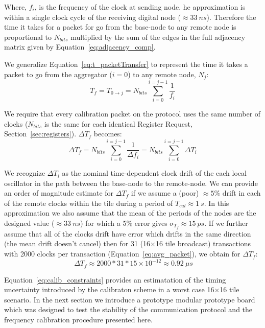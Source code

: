 Where, $f_{i}$, is the frequency of the clock at sending node. 
he approximation is within a single clock cycle of the receiving digital node ($\approx 33~\unit{ns}$).
Therefore the time it takes for a packet for go from the base-node to any remote node is proportional to $N_{bits}$ multiplied by the sum of the edges in the full adjacency matrix given by Equation~\ref{eq:adjacency_comp}.

We generalize Equation~\ref{eq:t_packetTransfer} to represent the time it takes a packet to go from the aggregator ($i = 0$) to any remote node, $N_{j}$:
\begin{equation}
  T_{f} = T_{0\rightarrow j} = N_{bits}\sum_{i=0}^{i=j-1}\frac{1}{f_{i}}
\end{equation}

We require that every calibration packet on the protocol uses the same number of clocks ($N_{bits}$ is the same for each identical Register Request, Section~\ref{sec:registers}).
$\Delta T_{f}$ becomes:
\begin{equation}
  \Delta T_{f} = N_{bits}\sum_{i=0}^{i=j-1}\frac{1}{\Delta f_{i}} = N_{bits} \sum_{i=0}^{i=j-1}\Delta T_{i}
\end{equation}

We recognize $\Delta T_{i}$ as the nominal time-dependent clock drift of the each local oscillator in the path between the base-node to the remote-node.
We can provide an order of magnitude estimate for $\Delta T_{f}$ if we assume a (poor) $\approx 5\%$ drift in each of the remote clocks within the tile during a period of $T_{cal} \approx 1~\unit{s}$.
In this approximation we also assume that the mean of the periods of the nodes are the designed value ($\approx 33~\unit{ns}$) for which a 5\% error gives $\sigma_{T_{f}} \approx 15~\unit{ps}$.
If we further assume that all of the clocks drift have error which drifts in the same direction (the mean drift doesn't cancel) then for 31 (16$\times$16 tile broadcast) transactions with 2000 clocks per transaction (Equation~\ref{eq:avg_packet}), we obtain for $\Delta T_{f}$:
\begin{equation}~\label{eq:calib_constraints}
  \Delta T_{f} \approx 2000 * 31 * 15\times 10^{-12} \approx 0.92~\unit{\mu s} 
\end{equation}

Equation~\ref{eq:calib_constraints} provides an estimatation of the timing uncertainty introduced by the calibraton scheme in a worst case 16$\times$16 tile scenario.
In the next section we introduce a prototype modular prototype board which was designed to test the stability of the communication protocol and the frequency calibration procedure presented here.

